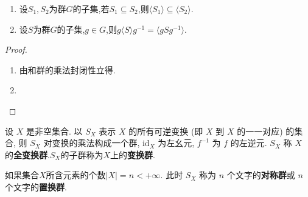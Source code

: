 \documentclass[../../main.tex]{subfiles}%
\begin{document}
\begin{proposition}\label{proposition:群的生成组的基本性质111}
\begin{enumerate}[(1)]
\item 设$S_1,S_2$为群$G$的子集,若$S_1\subseteq S_2$,则$\langle S_1 \rangle\subseteq \langle S_2 \rangle$.

\item 设$S$为群$G$的子集,$g\in G$,则$g\langle S\rangle g^{-1}=\langle gSg^{-1}\rangle .$
\end{enumerate}
\end{proposition}
\begin{proof}
\begin{enumerate}[(1)]
\item 由和群的乘法封闭性立得.

\item 
\end{enumerate}
\end{proof}

\begin{definition}
设 \( X \) 是非空集合. 以 \( S_X \) 表示 \( X \) 的所有可逆变换 (即 \( X \) 到 \( X \) 的一一对应) 的集合, 则 \( S_X \) 对变换的乘法构成一个群, \( \text{id}_X \) 为左幺元, \( f^{-1} \) 为 \( f \) 的左逆元. \( S_X \) 称 \( X \) 的\textbf{全变换群}.$S_X$的子群称为$X$上的\textbf{变换群}.

如果集合$X$所含元素的个数\( |X| = n < +\infty \). 此时 \( S_X \) 称为 \( n \) 个文字的\textbf{对称群}或 \( n \) 个文字的\textbf{置换群}.
\end{definition}
\end{document}
